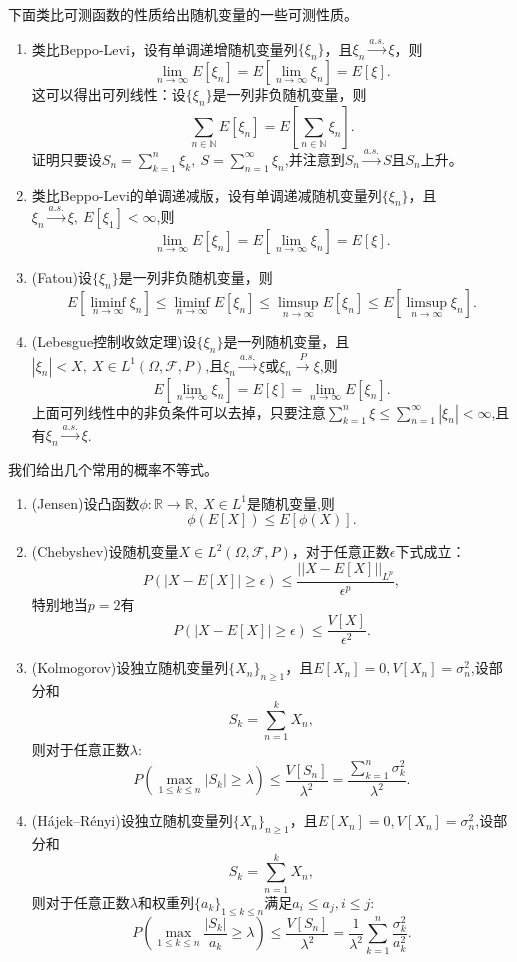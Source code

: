 \documentclass[lang=cn,10pt]{elegantbook}
\begin{document}
	下面类比可测函数的性质给出随机变量的一些可测性质。
	\begin{property}
		\begin{enumerate}
			\item 类比Beppo-Levi，设有单调递增随机变量列\(\{\xi_n\}\)，且\(\xi_n\xrightarrow{a.s.}\xi\)，则
			\[\lim_{n \to \infty}E[\xi_n]=E[\lim_{n \to \infty}\xi_n]=E[\xi].\]这可以得出可列线性：设\(\{\xi_n\}\)是一列非负随机变量，则
			\[\sum_{n\in \mathbb{N}}E[\xi_n]=E[\sum_{n\in \mathbb{N}}\xi_n].\]证明只要设\(S_n=\sum_{k=1}^{n}\xi_k,\ S=\sum_{n=1}^{\infty}\xi_n\),并注意到\(S_n\xrightarrow{a.s.}S\)且\(S_n\)上升。
			\item 类比Beppo-Levi的单调递减版，设有单调递减随机变量列\(\{\xi_n\}\)，且\(\xi_n\xrightarrow{a.s.}\xi,\ E[\xi_1]<\infty\),则
			\[\lim_{n \to \infty}E[\xi_n]=E[\lim_{n \to \infty}\xi_n]=E[\xi].\]
			\item (Fatou)设\(\{\xi_n\}\)是一列非负随机变量，则
			\[E[\liminf_{n \to \infty}\xi_n]\le \liminf_{n \to \infty}E[\xi_n]\le \limsup_{n\to \infty}E[\xi_n]\le E[\limsup_{n\to \infty}\xi_n].\]
			\item (Lebesgue控制收敛定理)设\(\{\xi_n\}\)是一列随机变量，且\(|\xi_n|<X,\ X\in L^1(\Omega,\mathcal{F},P)\),且\(\xi_n\xrightarrow{a.s.}\xi\)或\(\xi_n\xrightarrow{P}\xi\),则
			\[E[\lim_{n \to \infty}\xi_n]=E[\xi]=\lim_{n \to \infty}E[\xi_n].\]
			上面可列线性中的非负条件可以去掉，只要注意\(\sum_{k=1}^{n}\xi\le \sum_{n=1}^{\infty}|\xi_n|<\infty\),且有\(\xi_n\xrightarrow{a.s.}\xi\).
		\end{enumerate}
	\end{property}
	我们给出几个常用的概率不等式。
	\begin{proposition}
		\begin{enumerate}
			\item (Jensen)设凸函数\(\phi:\mathbb{R}\to \mathbb{R},\ X\in L^1\)是随机变量,则\[\phi(E[X])\le E[\phi(X)].\]
			\item (Chebyshev)设随机变量\(X\in L^2(\Omega,\mathcal{F},P)\)，对于任意正数\(\epsilon\)下式成立：\[P(|X-E[X]|\ge \epsilon)\le \frac{||X-E[X]||_{L^p}}{\epsilon^p},\]特别地当\(p=2\)有\[P(|X-E[X]|\ge \epsilon)\le \frac{V[X]}{\epsilon^2}.\]
			\item (Kolmogorov)设独立随机变量列\(\{X_n\}_{n\ge1}\)，且\(E[X_n]=0,V[X_n]=\sigma^2_n\),设部分和\[S_k=\sum_{n=1}^{k}X_n,\]则对于任意正数\(\lambda\):\[P(\max_{1\le k \le n}|S_k|\ge \lambda)\le\frac{V[S_n]}{\lambda^2}=\frac{\sum_{k=1}^{n}\sigma^2_k}{\lambda^2}.\]
			\item (Hájek–Rényi)设独立随机变量列\(\{X_n\}_{n\ge1}\)，且\(E[X_n]=0,V[X_n]=\sigma^2_n\),设部分和\[S_k=\sum_{n=1}^{k}X_n,\]则对于任意正数\(\lambda\)和权重列\(\{a_k\}_{1\le k\le n}\)满足\(a_i\le a_j,i\le j\):\[P(\max_{1\le k \le n}\frac{|S_k|}{a_k}\ge \lambda)\le\frac{V[S_n]}{\lambda^2}=\frac{1}{\lambda^2}\sum_{k=1}^{n}\frac{\sigma^2_k}{a_k^2}.\]
		\end{enumerate}
	\end{proposition}
	
\end{document}
